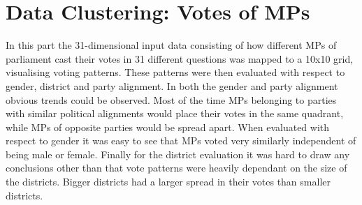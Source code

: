 \documentclass{article}
\begin{document}
\section{Data Clustering: Votes of MPs}
In this part the 31-dimensional input data consisting of how different MPs of parliament cast their votes in 31 different questions was mapped to a 10x10 grid, visualising voting patterns. These patterns were then evaluated with respect to gender, district and party alignment. In both the gender and party alignment obvious trends could be observed. Most of the time MPs belonging to parties with similar political alignments would place their votes in the same quadrant, while MPs of opposite parties would be spread apart. When evaluated with respect to gender it was easy to see that MPs voted very similarly independent of being male or female. Finally for the district evaluation it was hard to draw any conclusions other than that vote patterns were heavily dependant on the size of the districts. Bigger districts had a larger spread in their votes than smaller districts.



\end{document}
